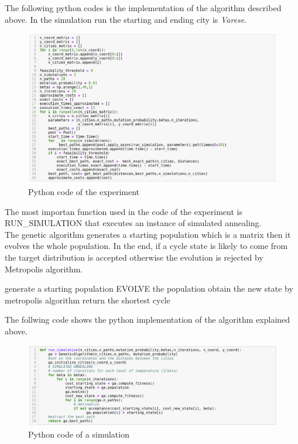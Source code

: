 \documentclass{article}
\begin{document}
\noindent The following python codes is the implementation of the algorithm described above. In the simulation run the starting and ending city is \textit{Varese}. \\
\begin{figure}[H]
\includegraphics[scale=0.5]{simulation.png} 
\centering
\caption{Python code of the experiment}
\end{figure}

\noindent The most importan function used in the code of the experiment is RUN\_SIMULATION that executes an instance of simulated annealing. \\
The genetic algorithm generates a starting population which is a matrix then it evolves the whole population. In the end, if a cycle state is likely to come from the target distribution is accepted otherwise the evolution is rejected by Metropolis algorithm.

\begin{algorithm}[H]
    \begin{algorithmic}[1]
      \State generate a starting population
       		\State EVOLVE the population
       		\State obtain the new state by metropolis algorithm
       	\EndFor 
       \EndFor
       \State return the shortest cycle
       \EndFunction
\end{algorithmic}
\end{algorithm}

\noindent The follwing code shows the python implementation of the algorithm explained above.
\begin{figure}[H]
\includegraphics[scale=0.38]{run_simulation.png} 
\centering
\caption{Python code of a simulation}
\end{figure}
\noindent
\end{document}
